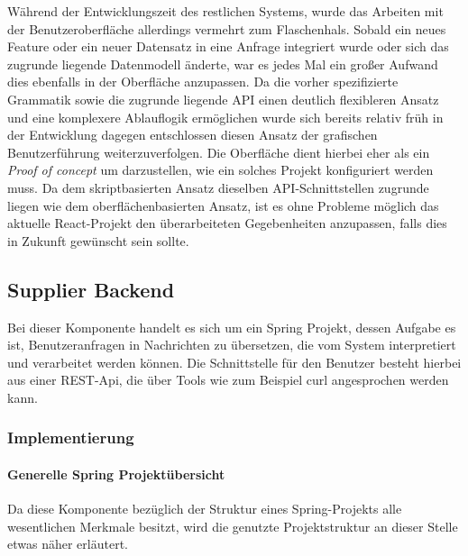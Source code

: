 Während der Entwicklungszeit des restlichen Systems, wurde das Arbeiten mit der Benutzeroberfläche allerdings vermehrt zum Flaschenhals. Sobald ein neues Feature oder ein neuer Datensatz in eine Anfrage integriert wurde oder sich das zugrunde liegende Datenmodell änderte, war es jedes Mal ein großer Aufwand dies ebenfalls in der Oberfläche anzupassen. Da die vorher spezifizierte Grammatik sowie die zugrunde liegende API einen deutlich flexibleren Ansatz und eine komplexere Ablauflogik ermöglichen wurde sich bereits relativ früh in der Entwicklung dagegen entschlossen diesen Ansatz der grafischen Benutzerführung weiterzuverfolgen. Die Oberfläche dient hierbei eher als ein \emph{Proof of concept} um darzustellen, wie ein solches Projekt konfiguriert werden muss. Da dem skriptbasierten Ansatz dieselben API-Schnittstellen zugrunde liegen wie dem oberflächenbasierten Ansatz, ist es ohne Probleme möglich das aktuelle React-Projekt den überarbeiteten Gegebenheiten anzupassen, falls dies in Zukunft gewünscht sein sollte.


\subsection{Supplier Backend \checkmark}
Bei dieser Komponente handelt es sich um ein Spring Projekt, dessen Aufgabe es ist, Benutzeranfragen in Nachrichten zu übersetzen, die vom System interpretiert und verarbeitet werden können. Die Schnittstelle für den Benutzer besteht hierbei aus einer REST-Api, die über Tools wie zum Beispiel curl angesprochen werden kann.

\subsubsection{Implementierung \checkmark}

\paragraph{Generelle Spring Projektübersicht \checkmark}
Da diese Komponente bezüglich der Struktur eines Spring-Projekts alle wesentlichen Merkmale besitzt, wird die genutzte Projektstruktur an dieser Stelle etwas näher erläutert. 

